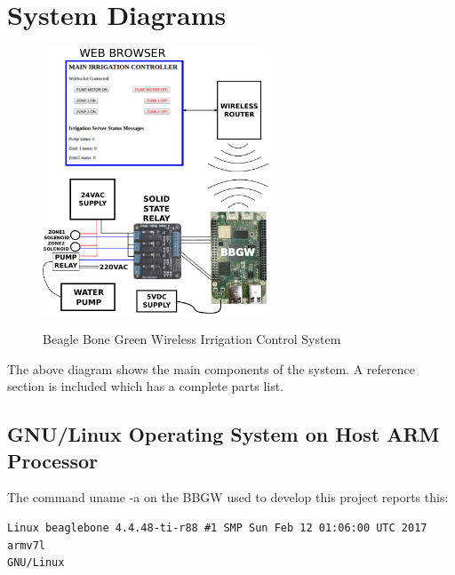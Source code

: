 %
%
%

\chapter{System Diagrams}

\begin{figure}[H]
	\centering
	\includegraphics[width=0.6\textwidth]{diagrams/system_diagram}
	\centering\bfseries
	\caption{Beagle Bone Green Wireless Irrigation Control System}
\end{figure}

The above diagram shows the main components of the system.  A reference section 
is included which has a complete parts list.


\section{GNU/Linux Operating System on Host ARM Processor}

The command uname -a on the BBGW used to develop this project reports this:

\begin{verbatim}
Linux beaglebone 4.4.48-ti-r88 #1 SMP Sun Feb 12 01:06:00 UTC 2017 armv7l 
GNU/Linux
\end{verbatim}






